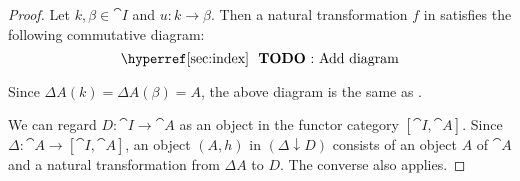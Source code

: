 \begin{proof}
   Let \( k, \beta \in \cat{I} \) and \( u: k \to \beta \). Then a natural transformation \( f \) in  satisfies the following commutative diagram:
  \begin{equation*}
    \text{\todo{Add diagram}}\iffalse\begin{mplibcode}
      beginfig(1);
      input metapost/graphs;

      v1 := thelabel("$\Delta A(k)$", (-1, 0) scaled u);
      v2 := thelabel("$\Delta A(\beta)$", (1, 0) scaled u);
      v3 := thelabel("$D(k)$", (-1, -1) scaled u);
      v4 := thelabel("$D(\beta)$", (1, -1) scaled u);

      a1 := straight_arc(v1, v2);
      a2 := straight_arc(v1, v3);
      a3 := straight_arc(v2, v4);
      a4 := straight_arc(v3, v4);

      draw_vertices(v);
      draw_arcs(a);

      label.top("$\Delta A(u)$", straight_arc_midpoint of a1);
      label.lft("$\pi_k$", straight_arc_midpoint of a2);
      label.rt("$\pi_\beta$", straight_arc_midpoint of a3);
      label.bot("$D(u)$", straight_arc_midpoint of a4);
      endfig;
    \end{mplibcode}\fi
  \end{equation*}

  Since \( \Delta A(k) = \Delta A(\beta) = A \), the above diagram is the same as .

   We can regard \( D: \cat{I} \to \cat{A} \) as an object in the functor category \( [\cat{I}, \cat{A}] \). Since \( \Delta: \cat{A} \to [\cat{I}, \cat{A}] \), an object \( (A, h) \) in \( (\Delta \downarrow D) \) consists of an object \( A \) of \( \cat{A} \) and a natural transformation from \( \Delta A \) to \( D \). The converse also applies.
\end{proof}

